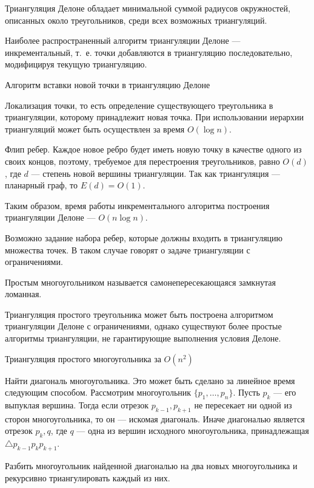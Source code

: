 \begin{theorem}
  Триангуляция Делоне обладает минимальной суммой радиусов
  окружностей, описанных около треугольников, среди всех возможных
  триангуляций.
\end{theorem}

Наиболее распространенный алгоритм триангуляции Делоне ---
инкрементальный, т.~е. точки добавляются в триангуляцию
последовательно, модифицируя текущую триангуляцию.
\begin{algorithm}{Алгоритм вставки новой точки в триангуляцию Делоне}
\item Локализация точки, то есть определение существующего
  треугольника в триангуляции, которому принадлежит новая точка. При
  использовании иерархии триангуляций может быть осуществлен за время
  $O(\log n)$.
\item Флип ребер. Каждое новое ребро будет иметь новую точку в
  качестве одного из своих концов, поэтому, требуемое для перестроения
  треугольников, равно $O(d)$, где $d$ --- степень новой вершины
  триангуляции. Так как триангуляция --- планарный граф, то $E(d)=O(1)$.
\end{algorithm}
Таким образом, время работы инкрементального алгоритма построения
триангуляции Делоне --- $O(n\log n)$.

Возможно задание набора ребер, которые должны входить в триангуляцию
множества точек. В таком случае говорят о задаче триангуляции с
ограничениями.

\begin{define}
  Простым многоугольником называется самонепересекающаяся замкнутая
  ломанная.
\end{define}

Триангуляция простого треугольника может быть построена алгоритмом
триангуляции Делоне с ограничениями, однако существуют более простые
алгоритмы триангуляции, не гарантирующие выполнения условия Делоне.

\begin{algorithm}{Триангуляция простого многоугольника за $O(n^2)$}
\item Найти диагональ многоугольника. Это может быть сделано за
 линейное время следующим способом. Рассмотрим многоугольник $\{p_1,
 \ldots, p_n\}$. Пусть $p_k$ --- его выпуклая вершина. Тогда если
 отрезок $p_{k-1}, p_{k+1}$ не пересекает ни одной из сторон
 многоугольника, то он --- искомая диагональ. Иначе диагональю
 является отрезок $p_k,q$, где $q$ --- одна из вершин исходного
 многоугольника, принадлежащая $\triangle p_{k-1}p_kp_{k+1}$.
\item Разбить многоугольник найденной диагональю на два новых
  многоугольника и рекурсивно триангулировать каждый из них.
\end{algorithm}

